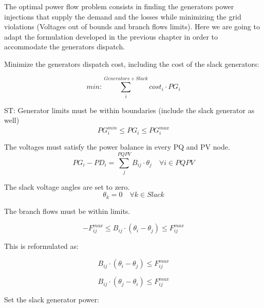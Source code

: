 \documentclass[a4paper,twoside,fleqn]{tufte-book}
\begin{document}
The optimal power flow problem consists in finding the generators power injections that supply the demand and the losses while minimizing the grid violations (Voltages out of bounds and branch flows limits). Here we are going to adapt the formulation developed in the previous chapter in order to accommodate the generators dispatch.

Minimize the generators dispatch cost, including the cost of the slack generators:

\begin{equation}
min: \sum_i^{Generators+Slack} cost_i \cdot PG_i 
\end{equation}

ST: 
Generator limits must be within boundaries (include the slack generator as well)
\begin{equation}
PG_i^{min} \leq PG_i \leq PG_i^{max}
\end{equation}


The voltages must satisfy the power balance in every PQ and PV node.
\begin{equation}
PG_i - PD_i=\sum_j^{PQPV} B_{ij} \cdot \theta_j  \quad  \forall i \in PQPV
\end{equation}



The slack voltage angles are set to zero.
\begin{equation}
\theta_k=0   \quad \forall k \in Slack
\end{equation}


The branch flows must be within limits.

\begin{equation}
-F_{ij}^{max} \leq B_{ij}⋅(\theta_i - \theta_j) \leq F_{ij}^{max}
\end{equation}


This is reformulated as:

\begin{equation}
 B_{ij}⋅(\theta_i - \theta_j) \leq F_{ij}^{max}
\end{equation}

\begin{equation}
 B_{ij}⋅(\theta_j - \theta_i) \leq F_{ij}^{max}
\end{equation}

Set the slack generator power:
\end{document}
